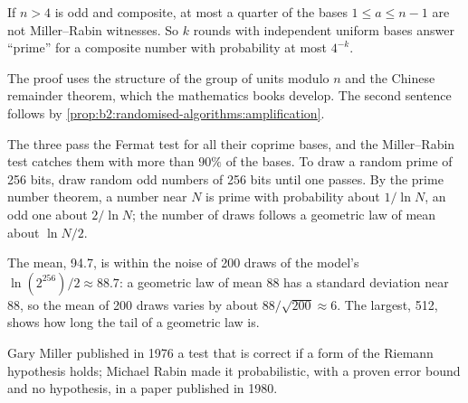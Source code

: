 \label{lst:b2:randomised-algorithms:primality}

\begin{theorem}\label{thm:b2:randomised-algorithms:miller-rabin}
If $n > 4$ is odd and composite, at most a quarter of the bases $1 \leq a \leq n - 1$ are not Miller--Rabin witnesses.
So $k$ rounds with independent uniform bases answer ``prime'' for a composite number with probability at most $4^{-k}$.
\end{theorem}

\admitted

The proof uses the structure of the group of units modulo $n$ and the Chinese remainder theorem, which the mathematics
books develop. The second sentence follows by \cref{prop:b2:randomised-algorithms:amplification}.

\label{out:b2:randomised-algorithms:fermat}

The three  pass the Fermat test for all their coprime bases, and the Miller--Rabin test catches them
with more than $90\%$ of the bases. To draw a random prime of 256 bits, draw random odd numbers of 256 bits until one
passes. By the prime number theorem, a number near $N$ is prime with probability about $1/\ln N$, an odd one about
$2/\ln N$; the number of draws follows a geometric law of mean about $\ln N / 2$.

\label{out:b2:randomised-algorithms:random-prime}

The mean, 94.7, is within the noise of 200 draws of the model's $\ln(2^{256})/2 \approx 88.7$: a geometric law of mean
88 has a standard deviation near 88, so the mean of 200 draws varies by about $88/\sqrt{200} \approx 6$. The largest,
512, shows how long the tail of a geometric law is.

\begin{history}
Gary Miller published in 1976 a test that is correct if a form of the Riemann hypothesis holds; Michael Rabin made it
probabilistic, with a proven error bound and no hypothesis, in a paper published in 1980.
\end{history}

